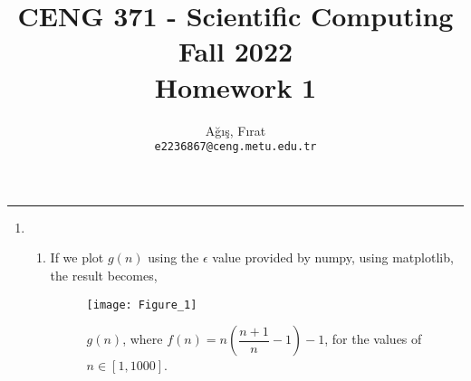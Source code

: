 \documentclass[10pt,a4paper, margin=1in]{article}
\author{
  Ağış, Fırat\\
  \texttt{e2236867@ceng.metu.edu.tr}
}
\title{CENG 371 - Scientific Computing \\
Fall 2022 \\
Homework 1}
\begin{document}
\maketitle

\noindent\rule{19cm}{1.2pt}

\begin{enumerate}
	\item %
   	\begin{enumerate}
    	\item %
    	If we plot $g(n)$ using the $\epsilon$ value provided by numpy, using matplotlib, the result becomes,
    	\begin{figure}[h]
  			\centering
  			\texttt{[image: Figure\_1]}
  			\caption{$g(n)$, where $f(n) = n\left( \dfrac{n+1}{n}-1\right)-1$, for the values of $n\in[1, 1000]$.}
  			\label{Q1a}
		\end{figure}
    	

\end{enumerate}
\end{enumerate}
\end{document}
